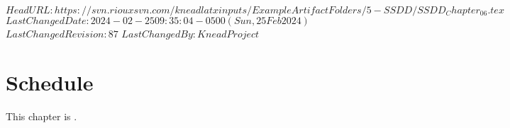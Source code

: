 \svnidlong
{$HeadURL: https://svn.riouxsvn.com/kneadlatxinputs/ExampleArtifactFolders/5-SSDD/SSDD_Chapter_06.tex $}
{$LastChangedDate: 2024-02-25 09:35:04 -0500 (Sun, 25 Feb 2024) $}
{$LastChangedRevision: 87 $}
{$LastChangedBy: KneadProject $}

\chapter{Schedule}
\label{loc:Schedule}

This chapter is \TBD.

